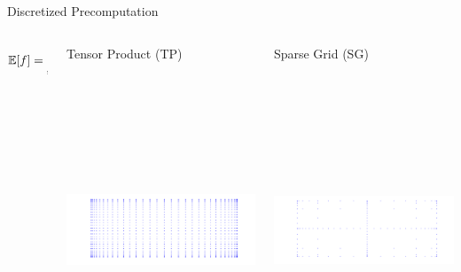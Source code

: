 \documentclass[final]{beamer}
\newcommand{\E}{\ensuremath{\mathbb{E}} } %
\newcommand {\bxi} {\mbox{\boldmath $\xi$}}%
\begin{document}
\begin{frame}{}
{\begin{columns}[t]
\begin{column}{.30\linewidth}
\begin{block}{\centering Discretized Precomputation}
\begin{columns}[T]
\begin{column}{10cm}{}
\centering
\vspace{3em}
$\E[f] = \sum\limits_{i=1}^M \omega_i f(\bxi_i)$
\end{column}

\begin{column}{12cm}{\centering \scriptsize{Tensor Product (TP)}}
\centering\includegraphics[height=10cm, width = 10cm]{figures/tensorproductpoints}
\end{column}

\begin{column}{12cm}{\centering \scriptsize{Sparse Grid (SG)}}
\centering\includegraphics[height=10cm, width = 10cm]{figures/smolyakpoints}
\end{column}
\end{columns}



\end{block}
\end{column}
\end{columns}}
\end{frame}
\end{document}

